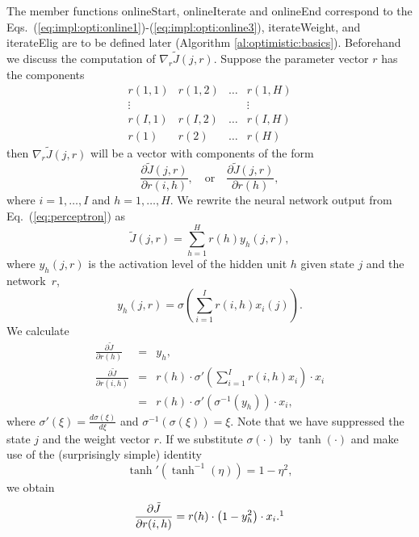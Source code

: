 The member functions {\al onlineStart}, {\al onlineIterate} and {\al onlineEnd} correspond to the Eqs.~(\ref{eq:impl:opti:online1})-(\ref{eq:impl:opti:online3}), {\al iterateWeight}, and {\al iterateElig} are to be defined later (Algorithm \ref{al:optimistic:basics}). Beforehand we discuss the computation of $\nabla_r \tilde J(j,r)$.
Suppose the parameter vector $r$ has the components 
$$\begin{array}{lllrllll}
r(1,1)&r(1,2)& \ldots&r(1,H)\\ 
\vdots&&&\vdots\\
r(I,1)&r(I,2)&\ldots&r(I,H)\\
r(1)&r(2)&\ldots&r(H)
\end{array}$$
then $\nabla_r \tilde J(j,r)$ will be a vector with components of the form 
$$ \frac{\partial \tilde J(j,r)}{\partial r(i,h)}, \quad \mbox{or} \quad \frac{\partial \tilde J(j,r)}{\partial r(h)},$$
where $i = 1,\ldots,I$ and $h = 1,\ldots,H$. We rewrite the neural network output from Eq.~(\ref{eq:perceptron}) as
$$\tilde J(j,r) = \sum_{h=1}^H r(h) y_h(j,r),$$ 
where $y_h(j,r)$ is the activation level of the hidden unit $h$ given state $j$ and the net\-work~$r$,
$$y_h(j,r)= \sigma\left ( \sum_{i=1}^I r(i,h) x_i(j) \right ).$$ 
We calculate 
\begin{eqnarray}
\frac{\partial \tilde J}{\partial r(h)} & = & y_h, \label{eq:perceptron:nabla1}\\
\frac{\partial \tilde J}{\partial r(i,h)} & = &  r(h) \cdot \sigma' \left ( \sum_{i=1}^I r(i,h) x_i \right )\cdot  x_i \nonumber \\
& = & r(h) \cdot \sigma'\left( \sigma^{-1}\left(y_h\right)\right) \cdot x_i,
\end{eqnarray}
where $\sigma'(\xi) = \frac{d\sigma(\xi)}{d\xi}$ and $\sigma^{-1}\left(\sigma(\xi)\right)=\xi$. Note that we have suppressed the state $j$ and the weight vector $r$. If we substitute $\sigma(\cdot)$ by $\tanh(\cdot)$ and make use of the (surprisingly simple) identity 
$$\tanh'\left(\tanh^{-1}(\eta )\right) = 1-\eta^2,$$
we obtain
\begin{equation} \label{eq:perceptron:nabla2}
\frac{\partial \tilde J}{\partial r(i,h)} = r(h) \cdot \left(1 -y_h^2\right)\cdot x_i. \footnotemark
\end{equation}

